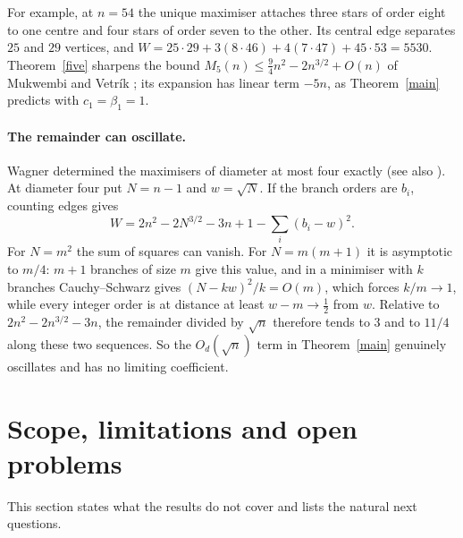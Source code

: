 \documentclass[11pt,a4paper]{article}
\theoremstyle{remark}
\begin{document}
For example, at $n=54$ the unique maximiser attaches three stars of order eight to one centre and four stars of order seven to the other. Its central edge separates $25$ and $29$ vertices, and $W=25\cdot29+3(8\cdot46)+4(7\cdot47)+45\cdot53=5530$. Theorem~\ref{five} sharpens the bound $M_5(n)\le\frac94n^2-2n^{3/2}+O(n)$ of Mukwembi and Vetrík \cite[Thm~3.3]{mv}; its expansion has linear term $-5n$, as Theorem~\ref{main} predicts with $c_1=\beta_1=1$.

\paragraph{The remainder can oscillate.} Wagner determined the maximisers of diameter at most four exactly \cite[Thm~3]{wagner} (see also \cite[Thm~2.12]{wang}). At diameter four put $N=n-1$ and $w=\sqrt N$. If the branch orders are $b_i$, counting edges gives
\[
 W=2n^2-2N^{3/2}-3n+1-\sum_i(b_i-w)^2 .
\]
For $N=m^2$ the sum of squares can vanish. For $N=m(m+1)$ it is asymptotic to $m/4$: $m+1$ branches of size $m$ give this value, and in a minimiser with $k$ branches Cauchy--Schwarz gives $(N-kw)^2/k=O(m)$, which forces $k/m\to1$, while every integer order is at distance at least $w-m\to\frac12$ from $w$. Relative to $2n^2-2n^{3/2}-3n$, the remainder divided by $\sqrt n$ therefore tends to $3$ and to $11/4$ along these two sequences. So the $O_d(\sqrt n)$ term in Theorem~\ref{main} genuinely oscillates and has no limiting coefficient.

\section{Scope, limitations and open problems}\label{sec:scope}
This section states what the results do not cover and lists the natural next questions.
\end{document}
